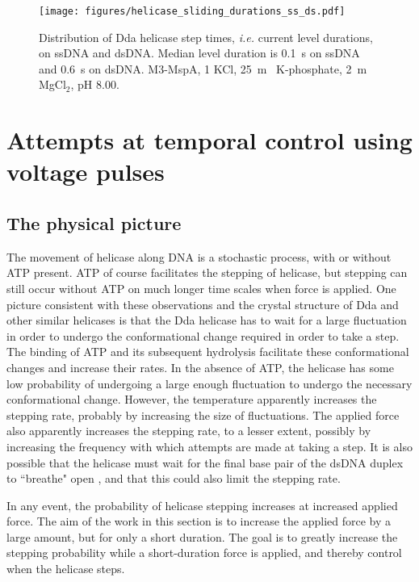 \begin{figure}[h]
\begin{centering}
\texttt{[image: figures/helicase\_sliding\_durations\_ss\_ds.pdf]}
\caption[Forced helicase step times on dsDNA and ssDNA]{Distribution of Dda helicase step times, \textit{i.e.} current level durations, on ssDNA and dsDNA.  Median level duration is \SI{0.1}{\s} on ssDNA and \SI{0.6}{\s} on dsDNA.  M3-MspA, \SI{1}{\Molar} KCl, \SI{25}{\m\Molar} K-phosphate, \SI{2}{\m\Molar} MgCl$_2$, pH \num{8.00}.}
\label{fig:helicase_stepping_hist_ss_ds}
\end{centering}
\end{figure}


\section{Attempts at temporal control using voltage pulses}

\subsection{The physical picture}

The movement of helicase along DNA is a stochastic process, with or without ATP present.  ATP of course facilitates the stepping of helicase, but stepping can still occur without ATP on much longer time scales when force is applied.  One picture consistent with these observations and the crystal structure of Dda and other similar helicases is that the Dda helicase has to wait for a large fluctuation in order to undergo the conformational change required in order to take a step.  The binding of ATP and its subsequent hydrolysis facilitate these conformational changes and increase their rates.  In the absence of ATP, the helicase has some low probability of undergoing a large enough fluctuation to undergo the necessary conformational change.  However, the temperature apparently increases the stepping rate, probably by increasing the size of fluctuations.  The applied force also apparently increases the stepping rate, to a lesser extent, possibly by increasing the frequency with which attempts are made at taking a step.  It is also possible that the helicase must wait for the final base pair of the dsDNA duplex to ``breathe" open \citep{Jose2009}, and that this could also limit the stepping rate.

In any event, the probability of helicase stepping increases at increased applied force.  The aim of the work in this section is to increase the applied force by a large amount, but for only a short duration.  The goal is to greatly increase the stepping probability while a short-duration force is applied, and thereby control when the helicase steps.

